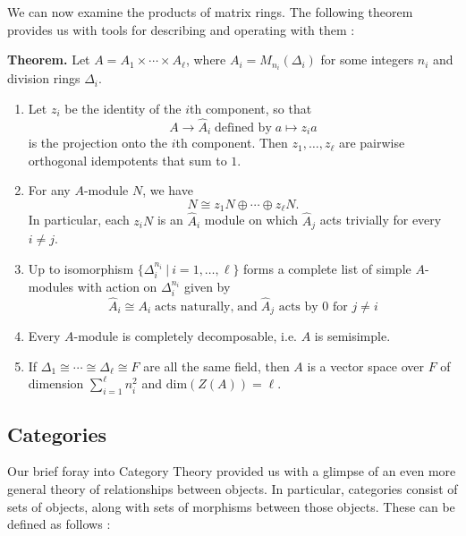 \documentclass[11pt, reqno]{amsart}
\theoremstyle{plain}
\theoremstyle{definition}
\theoremstyle{example}
\def\dim{\mathrm{dim}}
\begin{document}
\par
We can now examine the products of matrix rings. The following theorem provides us with tools for describing and operating with them \cite[Lec 20, p. 1]{dau}:

\par
\textbf{Theorem.} Let $A = A_1 \times \cdots \times A_{\ell}$, where $A_i = M_{n_i}(\Delta_i)$ for some integers $n_i$ and division rings $\Delta_i$.
\begin{enumerate}
\item Let $z_i$ be the identity of the $i$th component, so that $$A \to \hat{A}_i \; \text{defined by} \; a \mapsto z_i a$$ is the projection onto the $i$th component. Then $z_1, \ldots, z_{\ell}$ are pairwise orthogonal idempotents that sum to $1$.
\item For any $A$-module $N$, we have $$N \cong z_1 N \oplus \cdots \oplus z_{\ell} N.$$ In particular, each $z_i N$ is an $\hat{A}_i$ module on which $\hat{A}_j$ acts trivially for every $i \neq j$.
\item Up to isomorphism $\{\Delta_i^{n_i} \ | \ i = 1, \ldots, \ell\}$ forms a complete list of simple $A$-modules with action on $\Delta_i^{n_i}$ given by $$\hat{A}_i \cong A_i \; \text{acts naturally,} \; \text{and} \; \hat{A}_j \text{ acts by } 0 \text{ for } j \neq i$$
\item Every $A$-module is completely decomposable, i.e. $A$ is semisimple.
\item If $\Delta_1 \cong \cdots \cong \Delta_{\ell} \cong F$ are all the same field, then $A$ is a vector space over $F$ of dimension $\sum^{\ell}_{i=1} n^2_i$ and $\dim(Z(A)) = \ell$.
\end{enumerate}



\subsection{Categories}

Our brief foray into Category Theory provided us with a glimpse of an even more general theory of relationships between objects. In particular, categories consist of sets of objects, along with sets of morphisms between those objects. These can be defined as follows \cite[Lec. 15, p. 5]{dau}:
\end{document}
